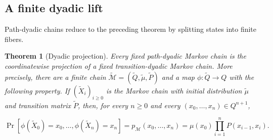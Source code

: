 \documentclass[10pt]{article}
\newtheorem{theorem}{Theorem}[section]
\theoremstyle{definition}
\begin{document}
\subsection{A finite dyadic lift}

Path-dyadic chains reduce to the preceding theorem by splitting states into
finite fibers.

\begin{theorem}[Dyadic projection]
\label{thm:projection}
Every fixed path-dyadic Markov chain is the coordinatewise projection of a
fixed transition-dyadic Markov chain.  More precisely, there are a finite
chain $\widetilde{\mathcal M}=(\widetilde Q,\widetilde\mu,\widetilde P)$ and
a map $\phi:\widetilde Q\to Q$ with the following property.  If
$(\widetilde X_i)_{i\ge0}$ is the Markov chain with initial distribution
$\widetilde\mu$ and transition matrix $\widetilde P$, then, for every $n\ge0$
and every $(x_0,\ldots,x_n)\in Q^{n+1}$,

\begin{equation}
 \Pr[\phi(\widetilde X_0)=x_0,\ldots,
      \phi(\widetilde X_n)=x_n]
 =p_{\mathcal M}(x_0,\ldots,x_n)
 =\mu(x_0)\prod_{i=1}^{n}P(x_{i-1},x_i).
\end{equation}
\end{theorem}
\end{document}
